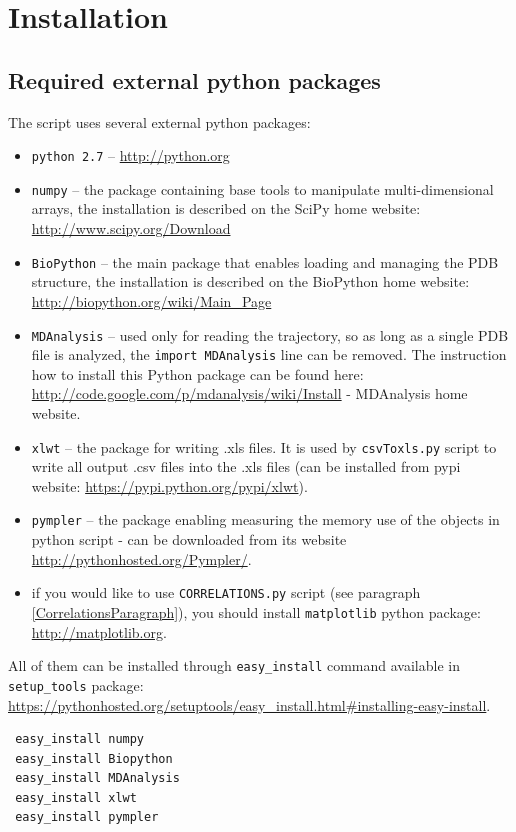 \documentclass[12pt]{article}
\begin{document}
\section{Installation} \label{external}
\subsection{Required external python packages} \label{external_pack}
The script uses several external python packages:
\begin{itemize}
\item {\tt python 2.7} -- \url{http://python.org}
\item  {\tt numpy} --  the package containing base tools to manipulate multi-dimensional arrays, the installation is described on the SciPy home website: \url{http://www.scipy.org/Download}
\item  {\tt BioPython} -- the main package that enables loading and managing the PDB structure, the installation is described on the BioPython home website: \url{http://biopython.org/wiki/Main_Page}
\item  {\tt MDAnalysis} \cite{Denning2012} -- used only for reading the trajectory, so as long as a single PDB file is  analyzed, the \texttt{import MDAnalysis} line can be removed. The instruction how to install this Python package can be found here: \url{http://code.google.com/p/mdanalysis/wiki/Install} - MDAnalysis home website. 
\item  {\tt xlwt} -- the package for writing .xls files. It is used by \texttt{csvToxls.py} script to write all output .csv files into the .xls files (can be installed from pypi website: \url{https://pypi.python.org/pypi/xlwt}).
\item  {\tt pympler} -- the package enabling measuring the memory use of the objects in python script - can be downloaded from its website \url{http://pythonhosted.org/Pympler/}. 
\item if you would like to use \texttt{CORRELATIONS.py} script (see paragraph \ref{CorrelationsParagraph}), you should install \texttt{matplotlib} python package: \url{http://matplotlib.org}. 
\end{itemize}

All of them can be installed through \texttt{easy\_install} command available in \texttt{setup\_tools} package: \url{https://pythonhosted.org/setuptools/easy_install.html#installing-easy-install}. 

\begin{verbatim}
 easy_install numpy  
 easy_install Biopython
 easy_install MDAnalysis
 easy_install xlwt
 easy_install pympler
\end{verbatim}
\end{document}
